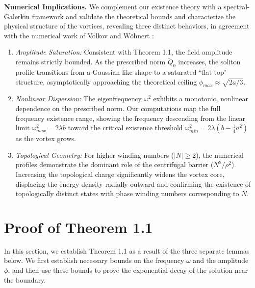 \documentclass[12pt]{article}
\begin{document}
\medskip
\noindent\textbf{Numerical Implications.} We complement our existence theory with a spectral-Galerkin framework and validate the theoretical bounds and characterize the physical structure of the vortices, revealing three distinct behaviors, in agreement with the numerical work of Volkov and W\"ohnert \cite{VW}:
\begin{enumerate}
    \item \textit{Amplitude Saturation:} Consistent with Theorem 1.1, the field amplitude remains strictly bounded. As the prescribed norm $\tilde{Q}_0$ increases, the soliton profile transitions from a Gaussian-like shape to a saturated ``flat-top" structure, asymptotically approaching the theoretical ceiling $\phi_{max} \approx \sqrt{2a/3}$.
    \item \textit{Nonlinear Dispersion:} The eigenfrequency $\omega^2$ exhibits a monotonic, nonlinear dependence on the prescribed norm. Our computations map the full frequency existence range, showing the frequency descending from the linear limit $\omega_{max}^2 = 2\lambda b$ toward the critical existence threshold $\omega_{min}^2=2\lambda\left(b-\frac{1}{4}a^2\right)$ as the vortex grows.
    \item \textit{Topological Geometry:} For higher winding numbers ($|N| \ge 2$), the numerical profiles demonstrate the dominant role of the centrifugal barrier ($N^2/\rho^2$). Increasing the topological charge significantly widens the vortex core, displacing the energy density radially outward and confirming the existence of topologically distinct states with phase winding numbers corresponding to $N$.
\end{enumerate}

	
	\section{Proof of Theorem 1.1}
	\setcounter{equation}{0}
	
	In this section, we establish Theorem 1.1 as a result of the three separate lemmas below. We first establish necessary bounds on the frequency $\omega$ and the amplitude $\phi$, and then use these bounds to prove the exponential decay of the solution near the boundary.
	
\end{document}
